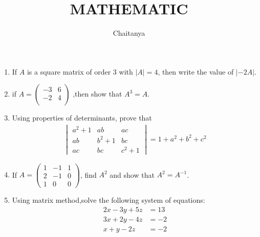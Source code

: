 \documentclass[12pt,-letter paper]{article}
\title{\textbf{MATHEMATIC}}
\author{Chaitanya}
\newcommand{\mydet}[1] 
{\ensuremath{\begin{vmatrix}
#1\end{vmatrix}}}
\newcommand{\myvec}[1]{\ensuremath{\begin{pmatrix}#1\end{pmatrix}}}
\begin{document}
\maketitle
\begin{enumerate}
\section{\textbf{Matrix}}
\item If $A$ is a square matrix of order 3 with $|A| = 4$, then write the value of $|-2A|$.
\item if $A =\myvec{
-3 & 6\\
-2 & 4\\
	}$ ,then show that $A^3=A$.
 \item Using properties of determinants, prove that
\begin{align*}
    \mydet{a^{2} + 1 & ab & ac\\
                ab & b^{2} + 1 & bc\\
		ac & bc & c^{2} + 1} = 1 + a^{2} + b^{2} + c^{2}
\end{align*}
\item If $A = \myvec{
		1 & -1 & 1\\
		2 & -1 & 0\\
		1 & 0 & 0
	}$, find $ A^{2}$ and show that $A^{2}
 = A^{-1}$.	
\item Using matrix method,solve the following system of equations:
	\begin{align*}
		2x - 3y + 5z &= 13\\
		3x + 2y - 4z &= -2\\
		x + y - 2z &= -2
	\end{align*}
 \end{enumerate}
\end{document}
